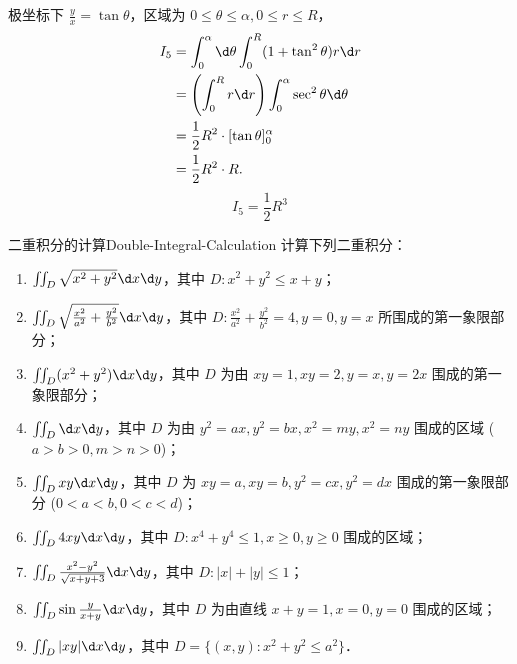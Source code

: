 \begin{solution}
    极坐标下 $\frac{y}{x} = \tan \theta$，区域为 $0 \le \theta \le \alpha, 0 \le r \le R$，
    \begin{equation}
        \begin{aligned}
            I_5 & = \int_{0}^{\alpha} \d \theta \int_{0}^{R} (1 + \tan^2 \theta) r \d r          \\
                & = \left( \int_{0}^{R} r \d r \right) \int_{0}^{\alpha} \sec^2 \theta \d \theta \\
                & = \frac{1}{2} R^2 \cdot [ \tan \theta ]_0^{\alpha}                             \\
                & = \frac{1}{2} R^2 \cdot R.
        \end{aligned}
    \end{equation}
    \begin{equation}
        I_5 = \boxed{\frac{1}{2} R^3}
    \end{equation}
\end{solution}


\begin{problem}{二重积分的计算}{Double-Integral-Calculation}
    计算下列二重积分：
    \begin{enumerate}
        \item $\iint_{D} \sqrt{x^{2}+y^{2}} \d x \d y$，其中 $D: x^{2}+y^{2} \leqslant x+y$；
        \item $\iint_{D} \sqrt{\frac{x^{2}}{a^{2}}+\frac{y^{2}}{b^{2}}} \d x \d y$，其中 $D: \frac{x^{2}}{a^{2}}+\frac{y^{2}}{b^{2}}=4, y=0, y=x$ 所围成的第一象限部分；
        \item $\iint_{D} (x^{2}+y^{2}) \d x \d y$，其中 $D$ 为由 $xy=1, xy=2, y=x, y=2x$ 围成的第一象限部分；
        \item $\iint_{D} \d x \d y$，其中 $D$ 为由 $y^{2}=ax, y^{2}=bx, x^{2}=my, x^{2}=ny$ 围成的区域 ($a>b>0, m>n>0$)；
        \item $\iint_{D} xy \d x \d y$，其中 $D$ 为 $xy=a, xy=b, y^{2}=cx, y^{2}=dx$ 围成的第一象限部分 ($0<a<b, 0<c<d$)；
        \item $\iint_{D} 4xy \d x \d y$，其中 $D: x^{4}+y^{4} \leqslant 1, x \geqslant 0, y \geqslant 0$ 围成的区域；
        \item $\iint_{D} \frac{x^{2}-y^{2}}{\sqrt{x+y+3}} \d x \d y$，其中 $D: |x|+|y| \leqslant 1$；
        \item $\iint_{D} \sin \frac{y}{x+y} \d x \d y$，其中 $D$ 为由直线 $x+y=1, x=0, y=0$ 围成的区域；
        \item $\iint_{D} |xy| \d x \d y$，其中 $D = \{(x,y) : x^2 + y^2 \leqslant a^2\}$．
    \end{enumerate}
\end{problem}

